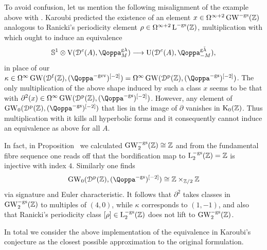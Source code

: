 \begin{remark}
To avoid confusion, let us mention the following misalignment of the example above with \cite{karoubi-periodicity}. Karoubi predicted the existence of an element $x \in \Omega^{\infty+2}\operatorname{GW}^{-\mathrm g\mathrm{s}}(\mathbb Z)$ analogous to Ranicki's periodicity element $\rho \in \Omega^{\infty+2}\operatorname L^{-\mathrm g\mathrm{s}}(\mathbb Z)$, multiplication with which ought to induce an equivalence
\[
\mathbb S^1 \otimes \mathrm V(\D^c(A),\QF^{\mathrm g\lambda}_{M})\longrightarrow\mathrm U(\D^c(A),\QF^{\mathrm g\check{\lambda}}_{-M}),
\]
in place of our $\kappa \in \Omega^\infty\GW(\Dfree(\mathbb Z),(\QF^{-\mathrm g\ev})\qshift{-2}) = \Omega^\infty\GW(\Dperf(\mathbb Z),(\QF^{-\mathrm g\sym})\qshift{-2})$. The only multiplication of the above shape induced by such a class $x$ seems to be that with $\partial^2(x) \in \Omega^\infty\GW(\Dperf(\mathbb Z),(\QF^{-\gs})\qshift{-2})$. However, any element of $\GW_0(\Dperf(\mathbb Z),(\QF^{-\gs})\qshift{-2})$ that lies in the image of $\partial$ vanishes in $\operatorname K_0(\mathbb Z)$. Thus multiplication with it kills all hyperbolic forms and it consequently cannot induce an equivalence as above for all $A$. 

In fact, in Proposition~ we calculated $\operatorname{GW}_2^{-\mathrm g\mathrm{s}}(\mathbb Z) \cong \mathbb Z$ and from the fundamental fibre sequence one reads off that the bordification map to $\operatorname L_2^{-\mathrm g\mathrm{s}}(\mathbb Z) = \mathbb Z$ is injective with index $4$. Similarly one finds 
\[
\GW_0(\Dperf(\mathbb Z),(\QF^{-\mathrm g\sym})\qshift{-2}) \cong \mathbb Z \times_{\mathbb Z/2} \mathbb Z
\]
via signature and Euler characteristic. It follows that $\partial^2$ takes classes in $\operatorname{GW}_2^{-\mathrm g\mathrm{s}}(\mathbb Z)$ to multiples of $(4,0)$, while $\kappa$ corresponds to $(1,-1)$, and also that Ranicki's periodicity class $[\rho] \in \operatorname L_2^{-\mathrm{g}\mathrm{s}}(\mathbb Z)$ does not lift to $\operatorname{GW}_2^{-\mathrm{g}\mathrm{s}}(\mathbb Z)$. 

In total we consider the above implementation of the equivalence in Karoubi's conjecture as the closest possible approximation to the original formulation.
\end{remark}




